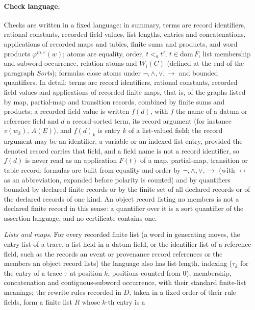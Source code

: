 \documentclass[11pt]{article}
\theoremstyle{definition}
\begin{document}
\paragraph{Check language.} Checks are written in a fixed language: in summary, terms are record identifiers, rational constants, recorded field values, list lengths, entries and concatenations, applications of recorded maps and tables, finite sums and products, and word products \(\varphi^{m,e}(w)\); atoms are equality, order, \(t<_o t'\), \(t\in\mathrm{dom}\,F\), list membership and subword occurrence, relation atoms and \(W_i(C)\) (defined at the end of the paragraph \emph{Sorts}); formulas close atoms under \(\neg,\wedge,\vee,\to\) and bounded quantifiers. In detail: terms are record identifiers,
rational constants, recorded field values and applications of recorded finite
maps, that is, of the graphs listed by map, partial-map and transition records, combined by finite sums and products; a recorded field value is written \(f(d)\), with \(f\) the name of a datum or reference field and \(d\) a record-sorted term, its record argument (for instance \(v(w_k)\), \(A(E)\)), and \(f(d)_k\) is entry \(k\) of a list-valued field; the record argument may be an identifier, a variable or an indexed list entry, provided the denoted record carries that field, and a field name is not a record identifier, so \(f(d)\) is never read as an application \(F(t)\) of a map, partial-map, transition or table record; formulas are built from equality
and order by \(\neg,\wedge,\vee,\to\) (with \(\leftrightarrow\) as an abbreviation,
expanded before polarity is counted) and by quantifiers bounded by declared finite
records or by the finite set of all declared records or of the declared records of one kind. An object record listing no members is not a declared finite record in this sense: a quantifier over it is a sort quantifier of the assertion language, and no certificate contains one.
\par\emph{Lists and maps.} For every recorded finite list (a word in generating moves, the entry list
of a trace, a list held in a datum field, or the identifier list of a
reference field, such as the records an event or provenance record references
or the members an object record lists) the language also has list
length, indexing (\(\tau_k\) for the entry of a trace \(\tau\) at position \(k\), positions counted from \(0\)),
membership, concatenation and contiguous-subword occurrence, with their
standard finite-list meanings; the rewrite rules recorded in \(D\), taken in a
fixed order of their rule fields, form a finite list \(R\) whose \(k\)-th entry is a
\end{document}
